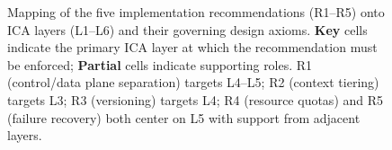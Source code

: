 \begin{figure}[htbp]
{\begin{tikzpicture}
\end{tikzpicture}}%
\caption{Mapping of the five implementation recommendations (R1--R5) onto ICA layers (L1--L6) and their governing design axioms. \textbf{Key} cells indicate the primary ICA layer at which the recommendation must be enforced; \textbf{Partial} cells indicate supporting roles. R1 (control/data plane separation) targets L4--L5; R2 (context tiering) targets L3; R3 (versioning) targets L4; R4 (resource quotas) and R5 (failure recovery) both center on L5 with support from adjacent layers.}
\label{fig:impl_recommendations}
\end{figure}
